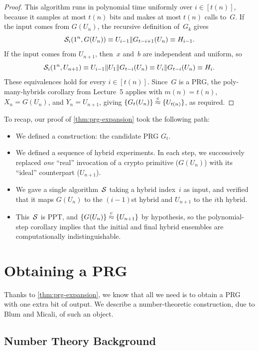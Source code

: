 \documentclass[11pt]{article}
\begin{document}
\begin{proof}
  This algorithm runs in polynomial time uniformly over $i\in[t(n)]$, because it samples at most $t(n)$ bits and makes at most $t(n)$ calls to~$G$.
  If the input comes from $G(U_n)$, the recursive definition of~$G_k$ gives
  \[
    \mathcal{S}_i(1^n,G(U_n))\equiv U_{i-1}\| G_{t-i+1}(U_n)\equiv H_{i-1}\text.
  \]
  If the input comes from $U_{n+1}$, then~$x$ and~$b$ are independent and uniform, so
  \[
    \mathcal{S}_i(1^n,U_{n+1})\equiv U_{i-1}\| U_1\| G_{t-i}(U_n) \equiv U_i\| G_{t-i}(U_n)\equiv H_i\text.
  \]
  These equivalences hold for every $i\in[t(n)]$.
  Since~$G$ is a PRG, the poly-many-hybrids corollary from Lecture~5 applies with $m(n)=t(n)$, $X_n=G(U_n)$, and $Y_n=U_{n+1}$, giving $\{G_t(U_n)\}\stackrel{c}{\approx}\{U_{t(n)}\}$, as required.
\end{proof}

\noindent To recap, our proof of \cref{thm:prg-expansion} took the following path:
\begin{itemize}
\item We defined a construction: the candidate PRG $G_t$.
\item We defined a sequence of hybrid experiments.
  In each step, we successively replaced \emph{one} ``real'' invocation of a crypto primitive ($G(U_{n})$) with its ``ideal'' counterpart ($U_{n+1}$).
\item We gave a single algorithm~$\mathcal{S}$ taking a hybrid index~$i$ as input, and verified that it maps $G(U_n)$ to the $(i-1)$st hybrid and $U_{n+1}$ to the $i$th hybrid.
\item This~$\mathcal{S}$ is PPT, and $\{G(U_{n})\} \stackrel{c}{\approx} \{U_{n+1}\}$ by hypothesis, so the polynomial-step corollary implies that the initial and final hybrid ensembles are computationally indistinguishable.
\end{itemize}

\section{Obtaining a PRG}
\label{sec:obtaining-prg}

Thanks to \cref{thm:prg-expansion}, we know that all we need is to obtain a PRG with one extra bit of output.
We describe a number-theoretic construction, due to Blum and Micali, of such an object.

\subsection{Number Theory Background}
\label{sec:background}
\end{document}
